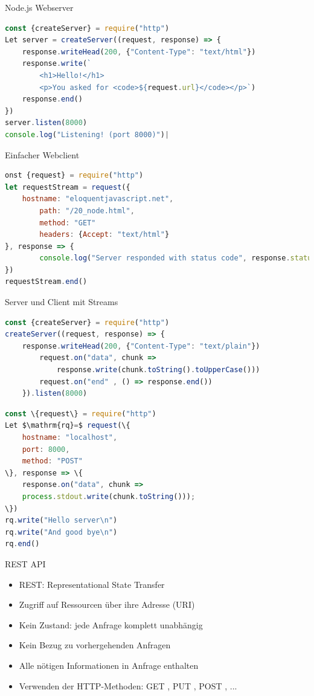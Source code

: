 \begin{code}{Node.js Webserver}
\begin{lstlisting}[language=JavaScript, style=base]
const {createServer} = require("http")
Let server = createServer((request, response) => {
    response.writeHead(200, {"Content-Type": "text/html"})
    response.write(`
        <h1>Hello!</h1>
        <p>You asked for <code>${request.url}</code></p>`)
    response.end()
})
server.listen(8000)
console.log("Listening! (port 8000)")|
\end{lstlisting}
\end{code}


\begin{code}{Einfacher Webclient}
\begin{lstlisting}[language=JavaScript, style=base]
onst {request} = require("http")
let requestStream = request({
    hostname: "eloquentjavascript.net",
        path: "/20_node.html",
        method: "GET"
        headers: {Accept: "text/html"}
}, response => {
        console.log("Server responded with status code", response.statusCode)
})
requestStream.end()
\end{lstlisting}
\end{code}

\begin{code}{Server und Client mit Streams}
\begin{lstlisting}[language=JavaScript, style=base]
const {createServer} = require("http")
createServer((request, response) => {
    response.writeHead(200, {"Content-Type": "text/plain"})
        request.on("data", chunk =>
            response.write(chunk.toString().toUpperCase()))
        request.on("end" , () => response.end())
    }).listen(8000)
\end{lstlisting}

\begin{lstlisting}[language=JavaScript, style=base]
const \{request\} = require("http")
Let $\mathrm{rq}=$ request(\{
    hostname: "localhost",
    port: 8000,
    method: "POST"
\}, response => \{
    response.on("data", chunk =>
    process.stdout.write(chunk.toString()));
\})
rq.write("Hello server\n")
rq.write("And good bye\n")
rq.end()
\end{lstlisting}
\end{code}

\begin{definition}{REST API}
\begin{itemize}
  \item REST: Representational State Transfer
  \item Zugriff auf Ressourcen über ihre Adresse (URI)
  \item Kein Zustand: jede Anfrage komplett unabhängig
  \item Kein Bezug zu vorhergehenden Anfragen
  \item Alle nötigen Informationen in Anfrage enthalten
  \item Verwenden der HTTP-Methoden: GET , PUT , POST , ...
\end{itemize}
\end{definition}

